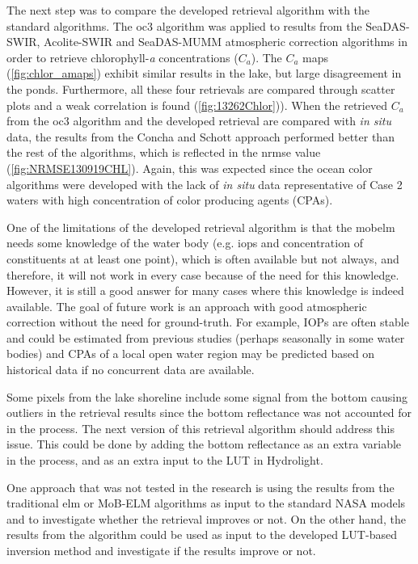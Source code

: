 The next step was to compare the developed retrieval algorithm with the standard algorithms. The \gls{oc3} algorithm was applied to results from the SeaDAS-SWIR, Acolite-SWIR and SeaDAS-MUMM atmospheric correction algorithms in order to retrieve chlorophyll-{\it a} concentrations ($C_a$). The $C_a$ maps (\autoref{fig:chlor_amaps}) exhibit similar results in the lake, but large disagreement in the ponds. Furthermore, all these four retrievals are compared through scatter plots and a weak correlation is found (\autoref{fig:13262Chlor})). When the retrieved $C_a$ from the \gls{oc3} algorithm and the developed retrieval are compared with {\it in situ} data, the results from the Concha and Schott approach performed better than the rest of the algorithms, which is reflected in the \gls{nrmse} value (\autoref{fig:NRMSE130919CHL}). Again, this was expected since the ocean color algorithms were developed with the lack of {\it in situ} data representative of Case 2 waters with high concentration of color producing agents (CPAs).




One of the limitations of the developed retrieval algorithm is that the \gls{mobelm} needs some knowledge of the water body (e.g. \gls{iops} and concentration of constituents at at least one point), which is often available but not always, and therefore, it will not work in every case because of the need for this knowledge. However, it is still a good answer for many cases where this knowledge is indeed available. The goal of future work is an approach with good atmospheric correction without the need for ground-truth. For example, IOPs are often stable and could be estimated from previous studies (perhaps seasonally in some water bodies) and CPAs of a local open water region may be predicted based on historical data if no concurrent data are available.

Some pixels from the lake shoreline include some signal from the bottom causing outliers in the retrieval results since the bottom reflectance was not accounted for in the process. The next version of this retrieval algorithm should address this issue. This could be done by adding the bottom reflectance as an extra variable in the process, and as an extra input to the LUT in Hydrolight. 

One approach that was not tested in the research is using the results from the traditional \gls{elm}  or MoB-ELM  algorithms as input to the standard NASA models and to investigate whether the retrieval improves or not. On the other hand, the results from the \citet{Gordon:1994} algorithm could be used as input to the developed LUT-based inversion method and investigate if the results improve or not.
